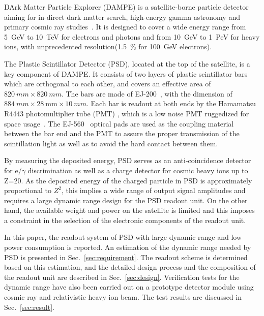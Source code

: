 \documentclass[preprint, times]{elsarticle}
\begin{document}
DArk Matter Particle Explorer (DAMPE) is a satellite-borne particle
detector aiming for in-direct dark matter search, high-energy gamma
astronomy and primary cosmic ray studies~\cite{Chang_Jin_dampe}. It is
designed to cover a wide energy range from \SI{5}{GeV} to
\SI{10}{TeV} for electrons and photons and from \SI{10}{GeV} to
\SI{1}{PeV} for heavy ions, with unprecedented
resolution(\SI{1.5}{\percent} for \SI{100}{\giga\electronvolt} electrons).

The Plastic Scintillator Detector (PSD), located at the top of the satellite, is a key component of DAMPE. 
It consists of two layers of plastic scintillator bars which are orthogonal to each other, and covers an effective area of
$\SI{820}{mm}\times\SI{820}{mm}$. 
The bars are made of EJ-200~\cite{scintillator}, with the dimension of $\SI{884}{mm} \times \SI{28}{\milli\meter} \times \SI{10}{mm}$.
Each bar  is readout at both ends by the Hamamatsu R4443 photomultiplier tube (PMT) , which is a low noise PMT ruggedized for space usage~\cite{r4443}. 
The EJ-560~\cite{scintillator} optical pads are used as the  coupling material between the bar end and the PMT to assure the proper transmission of the scintillation light as well as to avoid the hard contact between them.

By measuring the deposited energy, PSD serves as an anti-coincidence detector for e/$\gamma$ discrimination as well as a charge detector for cosmic heavy ions up to Z=20.
As the deposited energy of the charged particle in PSD is approximately proportional to $Z^2$, this implies a wide range of output signal amplitudes and requires a large dynamic range design for the PSD readout unit.
On the other hand, the available weight and power on the satellite is limited and this imposes a constraint in the selection of the electronic components of the readout unit.

In this paper, the readout system of PSD with large dynamic range and  low power consumption is reported.
An estimation of the dynamic range needed by PSD is presented in Sec.~\ref{sec:requirement}.
The readout scheme is determined based on this estimation, and the detailed design process and the composition of the readout unit are described in Sec.~\ref{sec:design}.
Verification tests for the dynamic range have also been carried out on a prototype detector module using cosmic ray and relativistic heavy ion beam.
The test results are discussed in Sec.~\ref{sec:result}.
\end{document}
